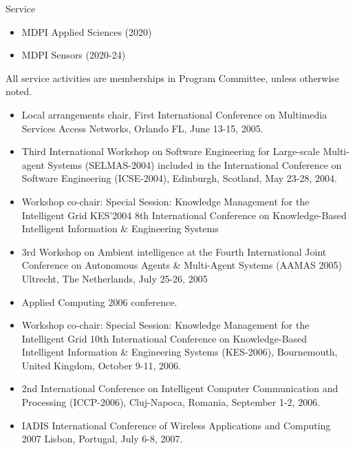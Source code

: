 \begin{category}{Service}
\begin{itemize}
\item MDPI Applied Sciences (2020)

\item MDPI Sensors (2020-24)

\end{itemize}

%
%

All service activities are memberships in Program Committee, unless otherwise noted.

\begin{itemize}

\item Local arrangements chair, First International Conference on Multimedia Services Access Networks, Orlando FL, June 13-15, 2005.

\item Third International Workshop on Software Engineering for Large-scale Multi-agent Systems (SELMAS-2004) included in the International Conference on Software Engineering (ICSE-2004), Edinburgh, Scotland, May 23-28, 2004.

\item Workshop co-chair: Special Session: Knowledge Management for the Intelligent Grid KES'2004 8th International Conference on Knowledge-Based Intelligent Information \& Engineering Systems


\item 3rd Workshop on Ambient intelligence at the Fourth International Joint Conference on Autonomous Agents \& Multi-Agent Systems (AAMAS 2005) Ultrecht, The Netherlands, July 25-26, 2005

\item Applied Computing 2006 conference.

\item Workshop co-chair: Special Session: Knowledge Management for the Intelligent Grid  10th International Conference on Knowledge-Based Intelligent Information \& Engineering Systems (KES-2006), Bournemouth, United Kingdom, October 9-11, 2006.

\item 2nd International Conference on Intelligent Computer Communication and Processing (ICCP-2006), Cluj-Napoca, Romania, September 1-2, 2006.

\item IADIS International Conference of Wireless Applications and Computing 2007 Lisbon, Portugal, July 6-8, 2007.


\end{itemize}
\end{category}
